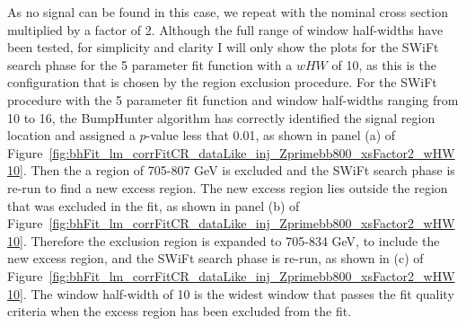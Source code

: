 As no signal can be found in this case, we repeat with the nominal cross section multiplied by a factor of 2.
Although the full range of window half-widths have been tested,
for simplicity and clarity I will only show the plots for the SWiFt search phase for the 5 parameter fit function with a $wHW$ of 10,
as this is the configuration that is chosen by the region exclusion procedure.
For the SWiFt procedure with the 5 parameter fit function and window half-widths ranging from 10 to 16,
the {\sc BumpHunter} algorithm has correctly identified the signal region location and assigned a  \mbox{$p$-value} less that 0.01,
as shown in panel (a) of Figure~\ref{fig:bhFit_lm_corrFitCR_dataLike_inj_Zprimebb800_xsFactor2_wHW10}.
Then the a region of 705-807 GeV is excluded and the SWiFt search phase is re-run to find a new excess region.
The new excess region lies outside the region that was excluded in the fit,
as shown in panel (b) of Figure~\ref{fig:bhFit_lm_corrFitCR_dataLike_inj_Zprimebb800_xsFactor2_wHW10}.
Therefore the exclusion region is expanded to 705-834 GeV, to include the new excess region, and the SWiFt search phase is re-run,
as shown in (c) of Figure~\ref{fig:bhFit_lm_corrFitCR_dataLike_inj_Zprimebb800_xsFactor2_wHW10}.
The window half-width of 10 is the widest window that passes the fit quality criteria when the excess region has been excluded from the fit.


